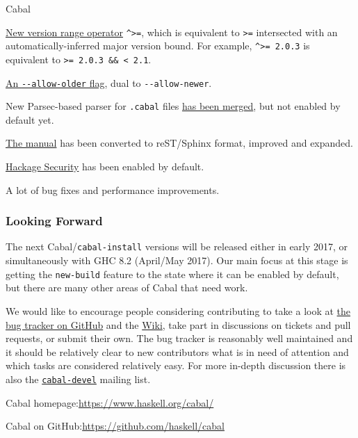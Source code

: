\begin{hcarentry}{Cabal}
\begin{compactitem}
\item
  \href{http://cabal.readthedocs.io/en/latest/developing-packages.html#pkg-field-build-depends}{New
    version range operator} \texttt{\^{}>=}, which is equivalent to
  \texttt{>=} intersected with an automatically-inferred major version
  bound. For example, \texttt{\^{}>= 2.0.3} is equivalent to \texttt{>=
    2.0.3 \&\& < 2.1}.

\item
  \href{http://cabal.readthedocs.io/en/latest/installing-packages.html#cmdoption-setup-configure--allow-newer}{An
    \texttt{-{}-allow-older} flag}, dual to \texttt{-{}-allow-newer}.

\item New Parsec-based parser for \texttt{.cabal} files
  \href{https://github.com/haskell/cabal/pull/3602}{has been merged},
  but not enabled by default yet.

\item \href{http://cabal.readthedocs.io/en/latest/}{The manual} has
  been converted to reST/Sphinx format, improved and expanded.

\item
  \href{https://www.well-typed.com/blog/2015/08/hackage-security-beta/}{Hackage
    Security} has been enabled by default.

\item A lot of bug fixes and performance improvements.

\end{compactitem}

\subsubsection*{Looking Forward}

The next Cabal/\texttt{cabal-install} versions will be released either
in early 2017, or simultaneously with GHC 8.2 (April/May 2017). Our
main focus at this stage is getting the \texttt{new-build} feature to
the state where it can be enabled by default, but there are many other
areas of Cabal that need work.

We would like to encourage people considering contributing to take a
look at \href{https://github.com/haskell/cabal/issues/}{the bug
  tracker on GitHub} and the
\href{https://github.com/haskell/cabal/wiki/Hackathon-2016}{Wiki},
take part in discussions on tickets and pull requests, or submit their
own. The bug tracker is reasonably well maintained and it should be
relatively clear to new contributors what is in need of attention and
which tasks are considered relatively easy. For more in-depth
discussion there is also the
\href{https://mail.haskell.org/mailman/listinfo/cabal-devel}{\texttt{cabal-devel}}
mailing list.

\FurtherReading
\begin{compactitem}
\item Cabal homepage:\hfill\url{https://www.haskell.org/cabal/}\\
\item Cabal on GitHub:\hfill\url{https://github.com/haskell/cabal}
\end{compactitem}
\end{hcarentry}
